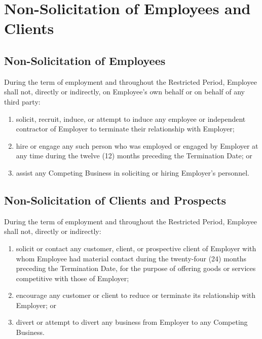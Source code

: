 \documentclass[11pt,a4paper]{article}
\begin{document}
\section{Non-Solicitation of Employees and Clients}

\subsection{Non-Solicitation of Employees}
\noindent
During the term of employment and throughout the Restricted Period, Employee shall not,
directly or indirectly, on Employee's own behalf or on behalf of any third party:

\begin{enumerate}[label=(\alph*), leftmargin=2em, itemsep=3pt]
  \item solicit, recruit, induce, or attempt to induce any employee or independent
        contractor of Employer to terminate their relationship with Employer;
  \item hire or engage any such person who was employed or engaged by Employer at any
        time during the twelve (12) months preceding the Termination Date; or
  \item assist any Competing Business in soliciting or hiring Employer's personnel.
\end{enumerate}

\subsection{Non-Solicitation of Clients and Prospects}
\noindent
During the term of employment and throughout the Restricted Period, Employee shall not,
directly or indirectly:

\begin{enumerate}[label=(\alph*), leftmargin=2em, itemsep=3pt]
  \item solicit or contact any customer, client, or prospective client of Employer with
        whom Employee had material contact during the twenty-four (24) months preceding
        the Termination Date, for the purpose of offering goods or services competitive
        with those of Employer;
  \item encourage any customer or client to reduce or terminate its relationship with
        Employer; or
  \item divert or attempt to divert any business from Employer to any Competing Business.
\end{enumerate}
\end{document}
